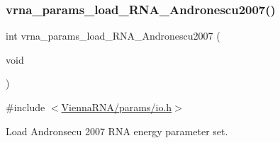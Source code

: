 \subsubsection{\texorpdfstring{vrna\_params\_load\_RNA\_Andronescu2007()}{vrna\_params\_load\_RNA\_Andronescu2007()}}
{\footnotesize\ttfamily int vrna\+\_\+params\+\_\+load\+\_\+\+R\+N\+A\+\_\+\+Andronescu2007 (\begin{DoxyParamCaption}\item[{void}]{ }\end{DoxyParamCaption})}



{\ttfamily \#include $<$\mbox{\hyperlink{io_8h}{Vienna\+R\+N\+A/params/io.\+h}}$>$}



Load Andronsecu 2007 R\+NA energy parameter set. 

